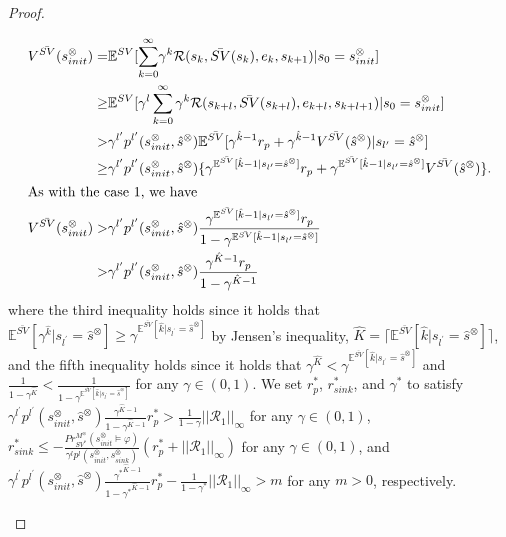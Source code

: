\documentclass[10pt]{article}
\theoremstyle{definition}
\begin{document}
\begin{proof}
\begin{enumerate}
    \begin{align}
     V^{\bar{SV}}(s^{\otimes}_{init})
      = & \mathbb{E}^{SV}[ {\sum_{k=0}^{\infty}} \gamma^k \mathcal{R}(s_k, \bar{SV}(s_k), e_k, s_{k+1}) | s_0 = s^{\otimes}_{init} ] \nonumber \\
      \geq & \mathbb{E}^{SV}[ \gamma^l \sum_{k=0}^{\infty} \gamma^k \mathcal{R}(s_{k+l}, \bar{SV}(s_{k+l}), e_{k+l}, s_{k+l+1}) | s_0 = s^{\otimes}_{init} ] \nonumber \\
      > & \gamma^{l^{\prime}} p^{l^{\prime}}(s^{\otimes}_{init}, \hat{s}^{\otimes}) \mathbb{E}^{\bar{SV}} [ \gamma^{\hat{k}-1} r_p + \gamma^{\hat{k}-1} V^{\bar{SV}}(\hat{s}^{\otimes}) | s_{l^{\prime}} = \hat{s}^{\otimes} ] \nonumber \\
      \geq & \gamma^{l^{\prime}} p^{l^{\prime}}(s^{\otimes}_{init}, \hat{s}^{\otimes}) \{ \gamma^{\mathbb{E}^{\bar{SV}}[\hat{k} - 1 | s_{l^{\prime}} = \hat{s}^{\otimes} ]} r_p + \gamma^{\mathbb{E}^{\bar{SV}}[\hat{k} - 1 | s_{l^{\prime}} = \hat{s}^{\otimes} ]} V^{\bar{SV}}(\hat{s}^{\otimes}) \}. \nonumber \\
   \intertext{As with the case 1, we have}
    V^{\bar{SV}}(s^{\otimes}_{init})
      > & \gamma^{l^{\prime}} p^{l^{\prime}}(s^{\otimes}_{init}, \hat{s}^{\otimes}) \frac{ \gamma^{\mathbb{E}^{\bar{SV}}[\hat{k} - 1 | s_{l^{\prime}} = \hat{s}^{\otimes} ]} r_p } { 1 - \gamma^{\mathbb{E}^{\bar{SV}}[\hat{k} - 1 | s_{l^{\prime}} = \hat{s}^{\otimes}]}} \nonumber \\
      > & \gamma^{l^{\prime}} p^{l^{\prime}}(s^{\otimes}_{init}, \hat{s}^{\otimes}) \frac{ \gamma^{\hat{K} - 1} r_p }{ 1 - \gamma^{\hat{K} - 1}}
    \end{align}
    where the third inequality holds since it holds that $\mathbb{E}^{\bar{SV}} [ \gamma^{\hat{k}} | s_{l^{\prime}} = \hat{s}^{\otimes} ] \geq \gamma^{\mathbb{E}^{\bar{SV}}[\hat{k} | s_{l^{\prime}} = \hat{s}^{\otimes} ]}$ by Jensen's inequality, $\hat{K} = \lceil \mathbb{E}^{\bar{SV}}[\hat{k} | s_{l^{\prime}} = \hat{s}^{\otimes} ] \rceil$, and the fifth inequality holds since it holds that $\gamma^{\hat{K}} < \gamma^{\mathbb{E}^{\bar{SV}}[\hat{k} | s_{l^{\prime}} = \hat{s}^{\otimes} ]}$ and $\frac{1}{1 - \gamma^{\hat{K}}} < \frac{1}{1 - \gamma^{\mathbb{E}^{\bar{SV}}[\hat{k} | s_{l^{\prime}} = \hat{s}^{\otimes} ]}}$ for any $\gamma \in (0,1)$.
    We set $r^{\ast}_p$, $r^{\ast}_{sink}$, and $\gamma^{\ast}$ to satisfy $ \gamma^{l^{\prime}} p^{l^{\prime}}(s^{\otimes}_{init}, \hat{s}^{\otimes}) \frac{ \gamma^{\hat{K} - 1} }{ 1 - \gamma^{\hat{K} - 1}} r^{\ast}_p > \frac{1}{1-\gamma} ||\mathcal{R}_1||_{\infty}$ for any $\gamma \in (0,1)$, $r^{\ast}_{sink} \leq - \frac{Pr^{M^{\otimes}}_{SV^{\ast}}(s^{\otimes}_{init} \models \varphi)}{ \gamma^l p^l (s^{\otimes}_{init}, s^{\otimes}_{sink})} (r^{\ast}_p + ||\mathcal{R}_1||_{\infty})$ for any $\gamma \in (0,1)$, and $\gamma^{l^{\prime}} p^{l^{\prime}}(s^{\otimes}_{init}, \hat{s}^{\otimes}) \frac{ {\gamma^{\ast}}^{\hat{K} - 1} }{ 1 - {\gamma^{\ast}}^{\hat{K} - 1}} r^{\ast}_p - \frac{1}{1-\gamma^{\ast}} ||\mathcal{R}_1||_{\infty} > m$ for any $m>0$, respectively.

\end{enumerate}
\end{proof}
\end{document}
